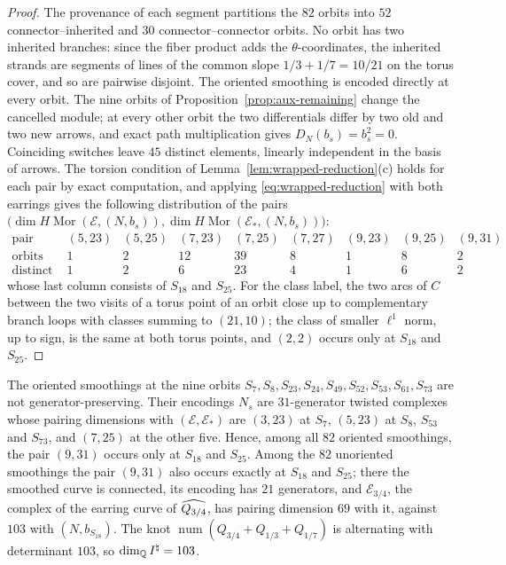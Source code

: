 \begin{proof}
The provenance of each segment partitions the $82$ orbits into $52$ connector--inherited
and $30$ connector--connector orbits.  No orbit has two inherited branches: since the fiber product adds the
$\theta$-coordinates, the inherited strands are segments of lines of the common slope $1/3+1/7=10/21$ on
the torus cover, and so are pairwise disjoint.  The oriented smoothing is encoded directly at every orbit.  The
nine orbits of Proposition~\ref{prop:aux-remaining} change the cancelled module; at every other orbit
the two differentials differ by two old and two new arrows, and exact path multiplication gives
$D_N(b_s)=b_s^2=0$.  Coinciding switches leave $45$ distinct elements, linearly independent in the
basis of arrows.  The torsion condition of Lemma~\ref{lem:wrapped-reduction}(c) holds for each pair by exact computation, and
applying \eqref{eq:wrapped-reduction} with both earrings gives the following distribution of the pairs $\bigl(\dim H\operatorname{Mor}(\mathcal E,(N,b_s)),\dim H\operatorname{Mor}(\mathcal
E_*,(N,b_s))\bigr)$:
\[
\begin{array}{c|cccccccc}
\text{pair}
 &(5,23)&(5,25)&(7,23)&(7,25)&(7,27)&(9,23)&(9,25)&(9,31)\\ \hline
\text{orbits}&1&2&12&39&8&1&8&2\\
\text{distinct switches}&1&2&6&23&4&1&6&2
\end{array}
\]
whose last column consists of $S_{18}$ and $S_{25}$.  For the class label, the two arcs of $C$ between
the two visits of a torus point of an orbit close up to complementary branch loops with classes summing
to $(21,10)$; the class of smaller $\ell^1$ norm, up to sign, is the same at both torus points, and
$(2,2)$ occurs only at $S_{18}$ and $S_{25}$.
\end{proof}

\begin{proposition}\label{prop:aux-remaining}
The oriented smoothings at the nine orbits $S_7,S_8,S_{23},S_{24},S_{49},S_{52},S_{53},S_{61},S_{73}$
are not generator-preserving.  Their encodings $N_s$ are $31$-generator twisted complexes whose pairing
dimensions with $(\mathcal E,\mathcal E_*)$ are $(3,23)$ at $S_7$, $(5,23)$ at $S_8$, $S_{53}$ and
$S_{73}$, and $(7,25)$ at the other five.  Hence, among all $82$ oriented smoothings, the pair $(9,31)$
occurs only at $S_{18}$ and $S_{25}$.  Among the $82$ unoriented smoothings the pair $(9,31)$ also occurs
exactly at $S_{18}$ and $S_{25}$; there the smoothed curve is connected, its encoding has $21$
generators, and $\mathcal E_{3/4}$, the complex of the earring curve of $\widehat{Q_{3/4}}$, has pairing dimension $69$
with it, against $103$ with $(N,b_{S_{18}})$.  The knot
$\operatorname{num}(Q_{3/4}+Q_{1/3}+Q_{1/7})$ is alternating with determinant $103$, so $\dim_{\mathbb{Q}}I^{\natural}=103$.
\end{proposition}

